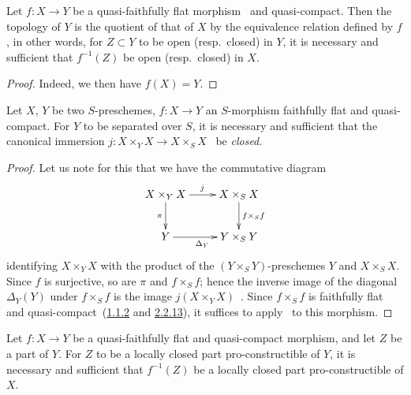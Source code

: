 \begin{corollary}[2.3.12]
\label{IV.2.3.12}
Let $f:X\to Y$ be a quasi-faithfully flat morphism~ and quasi-compact.
Then the topology of $Y$ is the quotient of that of $X$ by the equivalence relation defined by $f$, in other words, for $Z\subset Y$ to be open \textnormal{(}resp.\ closed\textnormal{)} in $Y$, it is necessary and sufficient that $f^{-1}(Z)$ be open \textnormal{(}resp.\ closed\textnormal{)} in $X$.
\end{corollary}

\begin{proof}
Indeed, we then have $f(X)=Y$.
\end{proof}

\begin{corollary}[2.3.13]
\label{IV.2.3.13}
Let $X$, $Y$ be two $S$-preschemes, $f:X\to Y$ an $S$-morphism faithfully flat and quasi-compact.
For $Y$ to be separated over $S$, it is necessary and sufficient that the canonical immersion $j:X\times_Y X\to X\times_S X$~ be \emph{closed}.
\end{corollary}

\begin{proof}
Let us note for this that we have the commutative diagram~
\[
\xymatrix{
  X\times_Y X \ar[r]^j \ar[d]_{\pi} & X\times_S X \ar[d]^{f\times_S f}\\
  Y \ar[r]_{\Delta_Y} & Y\times_S Y
}
\]
identifying $X\times_Y X$ with the product of the $(Y\times_S Y)$-preschemes $Y$ and $X\times_S X$.
Since $f$ is surjective, so are $\pi$ and $f\times_S f$; hence the inverse image of the diagonal $\Delta_Y(Y)$ under $f\times_S f$ is the image $j(X\times_Y X)$~.
Since $f\times_S f$ is faithfully flat and quasi-compact~({\hyperlink{ega4.c04.prop.1-1-2}{1.1.2}} and {\hyperlink{ega4.c04.cor.2-2-13}{2.2.13}}), it suffices to apply~ to this morphism.
\end{proof}

\begin{corollary}[2.3.14]
\label{IV.2.3.14}
Let $f:X\to Y$ be a quasi-faithfully flat and quasi-compact morphism, and let $Z$ be a part of $Y$.
For $Z$ to be a locally closed part pro-constructible of $Y$, it is necessary and sufficient that $f^{-1}(Z)$ be a locally closed part pro-constructible of $X$.
\end{corollary}

